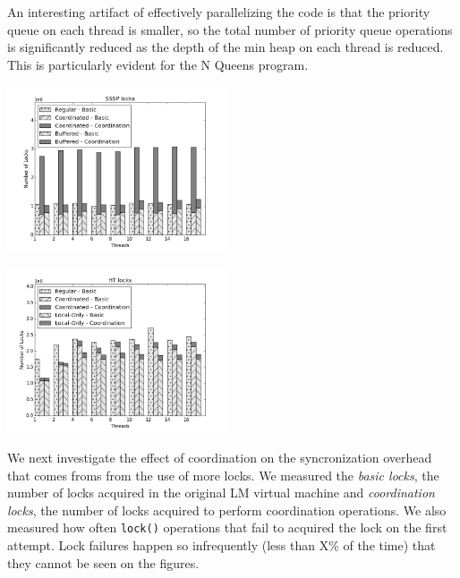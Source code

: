 An interesting artifact of effectively parallelizing the code is that
the priority queue on each thread is smaller, so the total number of
priority queue operations is significantly reduced as the depth of the
min heap on each thread is reduced.  This is particularly evident for
the N Queens program.

\begin{topfig}
   \begin{center}
      \includegraphics[width=6.5cm]{results/locks/sssp-locks.png}
   \end{center}
\end{topfig}

\begin{topfig}
   \begin{center}
      \includegraphics[width=6.5cm]{results/locks/ht-locks.png}
   \end{center}
\end{topfig}

We next investigate the effect of coordination on the syncronization
overhead that comes froms from the use of more locks.  We measured the
\emph{basic locks}, the number of locks acquired
in the original LM virtual machine and \emph{coordination locks}, the
number of locks acquired to perform coordination operations.  We also
measured how often \texttt{lock()} operations that fail to acquired
the lock on the first attempt.  Lock failures happen so infrequently
(less than X\%  of the time) that they
cannot be seen on the figures.

